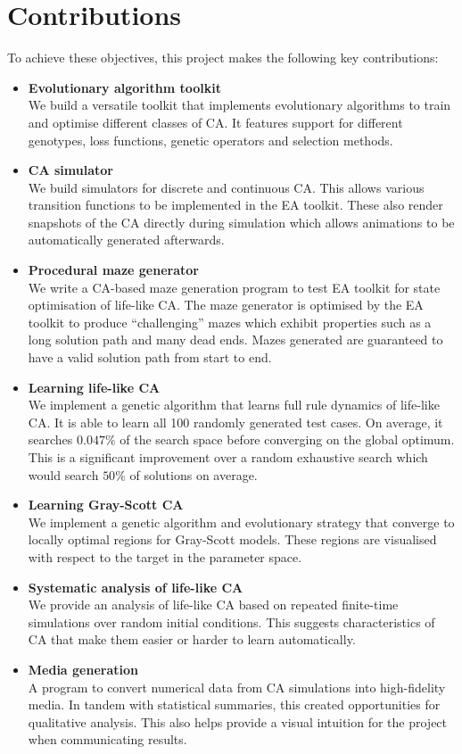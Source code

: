 \section{Contributions}
To achieve these objectives, this project makes the following key contributions:
\begin{itemize}
    \item \textbf{Evolutionary algorithm toolkit}\\ We build a versatile toolkit that implements evolutionary algorithms to train and optimise different classes of CA. It features support for different genotypes, loss functions, genetic operators and selection methods.
    \item \textbf{CA simulator}\\ We build simulators for discrete and continuous CA. This allows various transition functions to be implemented in the EA toolkit. These also render snapshots of the CA directly during simulation which allows animations to be automatically generated afterwards.
    \item \textbf{Procedural maze generator}\\ We write a CA-based maze generation program to test EA toolkit for state optimisation of life-like CA. The maze generator is optimised by the EA toolkit to produce ``challenging'' mazes which exhibit properties such as a long solution path and many dead ends. Mazes generated are guaranteed to have a valid solution path from start to end.
    \item \textbf{Learning life-like CA}\\ We implement a genetic algorithm that learns full rule dynamics of life-like CA. It is able to learn all 100 randomly generated test cases. On average, it searches $0.047\%$ of the search space before converging on the global optimum. This is a significant improvement over a random exhaustive search which would search $50\%$ of solutions on average.
    \item \textbf{Learning Gray-Scott CA}\\ We implement a genetic algorithm and evolutionary strategy that converge to locally optimal regions for Gray-Scott models. These regions are visualised with respect to the target in the parameter space.
    \item \textbf{Systematic analysis of life-like CA}\\ We provide an analysis of life-like CA based on repeated finite-time simulations over random initial conditions. This suggests characteristics of CA that make them easier or harder to learn automatically.
    \item \textbf{Media generation}\\ A program to convert numerical data from CA simulations into high-fidelity media. In tandem with statistical summaries, this created opportunities for qualitative analysis. This also helps provide a visual intuition for the project when communicating results.
\end{itemize}

